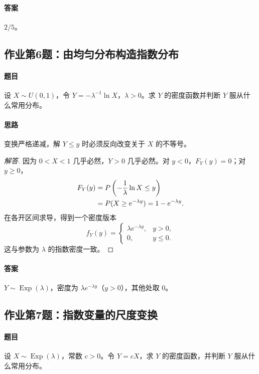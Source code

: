 \paragraph{答案} $2/5$。

\subsection{作业第6题：由均匀分布构造指数分布}\label{ex:w09-h6}
\paragraph{题目}
设 $X\sim U(0,1)$，令 $Y=-\lambda^{-1}\ln X$，$\lambda>0$。求 $Y$ 的密度函数并判断 $Y$ 服从什么常用分布。
\paragraph{思路} 变换严格递减，解 $Y\leq y$ 时必须反向改变关于 $X$ 的不等号。
\begin{proof}[解答]
因为 $0<X<1$ 几乎必然，$Y>0$ 几乎必然。对 $y<0$，$F_Y(y)=0$；对 $y\geq0$，
\begin{align*}
F_Y(y)
&=\P\left(-\frac1\lambda\ln X\leq y\right)\\
&=\P(X\geq e^{-\lambda y})
=1-e^{-\lambda y}.
\end{align*}
在各开区间求导，得到一个密度版本
\[
f_Y(y)=\begin{cases}\lambda e^{-\lambda y},&y>0,\\0,&y\leq0.\end{cases}
\]
这与参数为 $\lambda$ 的指数密度一致。
\end{proof}
\paragraph{答案} $Y\sim\operatorname{Exp}(\lambda)$，密度为 $\lambda e^{-\lambda y}$（$y>0$），其他处取 $0$。

\subsection{作业第7题：指数变量的尺度变换}\label{ex:w09-h7}
\paragraph{题目}
设 $X\sim\operatorname{Exp}(\lambda)$，常数 $c>0$。令 $Y=cX$，求 $Y$ 的密度函数，并判断 $Y$ 服从什么常用分布。
